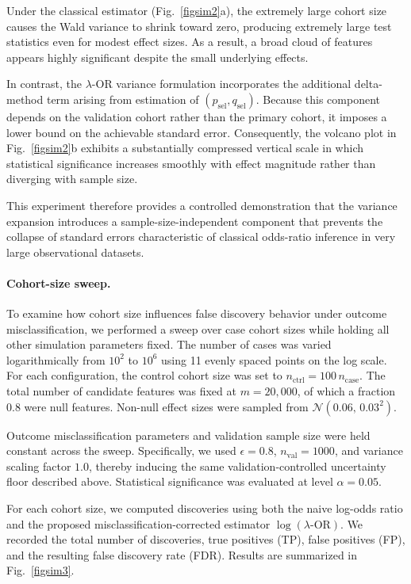\documentclass[pdflatex,sn-mathphys-num]{sn-jnl}%
\theoremstyle{thmstyleone}%
\theoremstyle{thmstyletwo}%
\theoremstyle{thmstylethree}%
\begin{document}
Under the classical estimator (Fig.~\ref{figsim2}a), the extremely large cohort
size causes the Wald variance to shrink toward zero, producing extremely large
test statistics even for modest effect sizes. As a result, a broad cloud of
features appears highly significant despite the small underlying effects.

In contrast, the \(\lambda\)-OR variance formulation incorporates the additional
delta-method term arising from estimation of \((p_{\mathrm{sel}},q_{\mathrm{sel}})\).
Because this component depends on the validation cohort rather than the primary
cohort, it imposes a lower bound on the achievable standard error. Consequently,
the volcano plot in Fig.~\ref{figsim2}b exhibits a substantially compressed
vertical scale in which statistical significance increases smoothly with effect
magnitude rather than diverging with sample size.

This experiment therefore provides a controlled demonstration that  the variance expansion
introduces a sample-size-independent component that prevents the collapse of
standard errors characteristic of classical odds-ratio inference in very large
observational datasets.

\paragraph{Cohort-size sweep.}
To examine how cohort size influences false discovery behavior under outcome
misclassification, we performed a sweep over case cohort sizes while holding all
other simulation parameters fixed. The number of cases was varied logarithmically
from \(10^{2}\) to \(10^{6}\) using 11 evenly spaced points on the log scale.
For each configuration, the control cohort size was set to
\(n_{\mathrm{ctrl}} = 100\, n_{\mathrm{case}}\). The total number of candidate
features was fixed at \(m=20{,}000\), of which a fraction \(0.8\) were null
features. Non-null effect sizes were sampled from
\(\mathcal{N}(0.06,\,0.03^{2})\).

Outcome misclassification parameters and validation sample size were held constant
across the sweep. Specifically, we used \(\epsilon = 0.8\),
\(n_{\mathrm{val}} = 1000\), and variance scaling factor \(1.0\), thereby inducing
the same validation-controlled uncertainty floor described above. Statistical
significance was evaluated at level \(\alpha = 0.05\).

For each cohort size, we computed discoveries using both the naive log-odds ratio
and the proposed misclassification-corrected estimator \(\log(\lambda\text{-OR})\).
We recorded the total number of discoveries, true positives (TP), false positives
(FP), and the resulting false discovery rate (FDR). Results are summarized in
Fig.~\ref{figsim3}.
\end{document}
